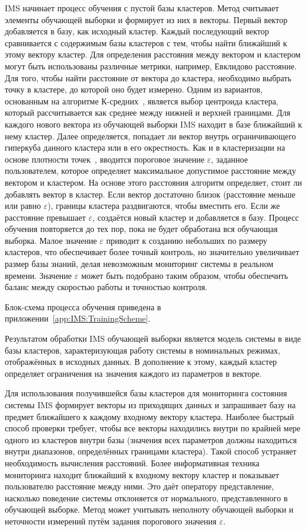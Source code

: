IMS начинает процесс обучения с пустой базы кластеров. Метод считывает элементы обучающей выборки и формирует из них в векторы. Первый вектор добавляется в базу, как исходный кластер. Каждый последующий вектор сравнивается с содержимым базы кластеров с тем, чтобы найти ближайший к этому вектору кластер. Для определения расстояния между вектором и кластером могут быть использованы различные метрики, например, Евклидово расстояние. Для того, чтобы найти расстояние от вектора до кластера, необходимо выбрать точку в кластере, до которой оно будет измерено. Одним из вариантов, основанным на алгоритме К-средних~\cite{BradleyKMeans}, является выбор центроида кластера, который рассчитывается как среднее между нижней и верхней границами. Для каждого нового вектора из обучающей выборки IMS находит в базе ближайший к нему кластер. Далее определяется, попадает ли вектор внутрь ограничивающего гиперкуба данного кластера или в его окрестность. Как и в кластеризации на основе плотности точек~\cite{EsterDensityBasedClustering}, вводится пороговое значение $\varepsilon$, заданное пользователем, которое определяет максимальное допустимое расстояние между вектором и кластером. На основе этого расстояния алгоритм определяет, стоит ли добавлять вектор в кластер. Если вектор достаточно близок (расстояние меньше или равно $\varepsilon$), границы кластера раздвигаются, чтобы вместить его. Если же расстояние превышает $\varepsilon$, создаётся новый кластер и добавляется в базу. Процесс обучения повторяется до тех пор, пока не будет обработана вся обучающая выборка. Малое значение $\varepsilon$ приводит к созданию небольших по размеру кластеров, что обеспечивает более точный контроль, но значительно увеличивает размер базы знаний, делая невозможным мониторинг системы в реальном времени. Значение $\varepsilon$ может быть подобрано таким образом, чтобы обеспечить баланс между скоростью работы и точностью контроля.

Блок-схема процесса обучения приведена в приложении~\ref{app:IMS:TrainingScheme}.

Результатом обработки IMS обучающей выборки является модель системы в виде базы кластеров, характеризующая работу системы в номинальных режимах, отображённых в исходных данных. В дополнение к этому, каждый кластер определяет ограничения на значения каждого из параметров в векторе.

Для использования получившейся базы кластеров для мониторинга состояния системы IMS формирует векторы из приходящих данных и запрашивает базу на предмет ближайшего к каждому входному вектору кластера. Наиболее быстрый способ проверки требует, чтобы все векторы находились внутри по крайней мере одного из кластеров внутри базы (значения всех параметров должны находиться внутри диапазонов, определённых границами кластера). Такой способ устраняет необходимость вычисления расстояний. Более информативная техника мониторинга находит ближайший к входному вектору кластер и показывает пользователю расстояние между ними. Это даёт оператору представление, насколько поведение системы отклоняется от нормального, представленного в обучающей выборке. Метод может учитывать неполноту обучающей выборки и неточности измерений путём задания порогового значения $\varepsilon$.

